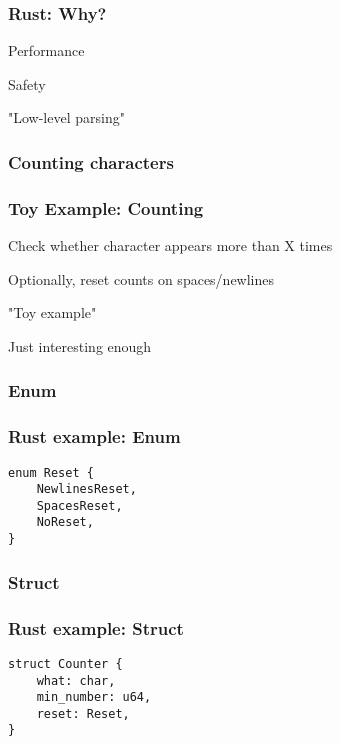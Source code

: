 \documentclass[ignorenonframetext]{beamer}
\begin{document}
\begin{frame}
\frametitle{Rust: Why?}

\pause

Performance \pause

Safety \pause

"Low-level parsing"

\end{frame}

\hypertarget{counting-characters}{%
\subsubsection{Counting characters}\label{counting-characters}}

\begin{frame}
\frametitle{Toy Example: Counting}

\pause

Check whether character appears more than X times \pause

Optionally, reset counts on spaces/newlines \pause

"Toy example" \pause

Just interesting enough

\end{frame}

\hypertarget{enum}{%
\subsubsection{Enum}\label{enum}}

\begin{frame}[fragile]
\frametitle{Rust example: Enum}

\begin{lstlisting}
enum Reset {
    NewlinesReset,
    SpacesReset,
    NoReset,
}
\end{lstlisting}
\end{frame}

\hypertarget{struct}{%
\subsubsection{Struct}\label{struct}}

\begin{frame}[fragile]
\frametitle{Rust example: Struct}

\begin{lstlisting}
struct Counter {
    what: char,
    min_number: u64,
    reset: Reset, 
}
\end{lstlisting}
\end{frame}
\end{document}
